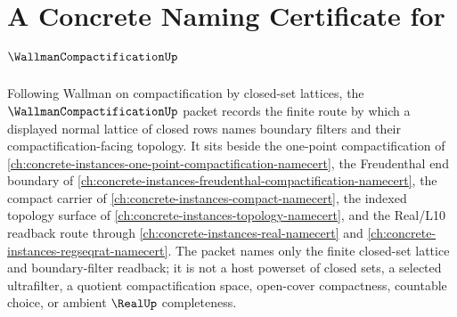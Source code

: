 \chapter{A Concrete Naming Certificate for $\WallmanCompactificationUp$}
\label{ch:concrete-instances-wallman-compactification-namecert}

Following Wallman on compactification by closed-set lattices, the $\WallmanCompactificationUp$ packet records the finite route by which a displayed normal lattice of closed rows names boundary filters and their compactification-facing topology. It sits beside the one-point compactification of \autoref{ch:concrete-instances-one-point-compactification-namecert}, the Freudenthal end boundary of \autoref{ch:concrete-instances-freudenthal-compactification-namecert}, the compact carrier of \autoref{ch:concrete-instances-compact-namecert}, the indexed topology surface of \autoref{ch:concrete-instances-topology-namecert}, and the Real/L10 readback route through \autoref{ch:concrete-instances-real-namecert} and \autoref{ch:concrete-instances-regseqrat-namecert}. The packet names only the finite closed-set lattice and boundary-filter readback; it is not a host powerset of closed sets, a selected ultrafilter, a quotient compactification space, open-cover compactness, countable choice, or ambient $\RealUp$ completeness.

